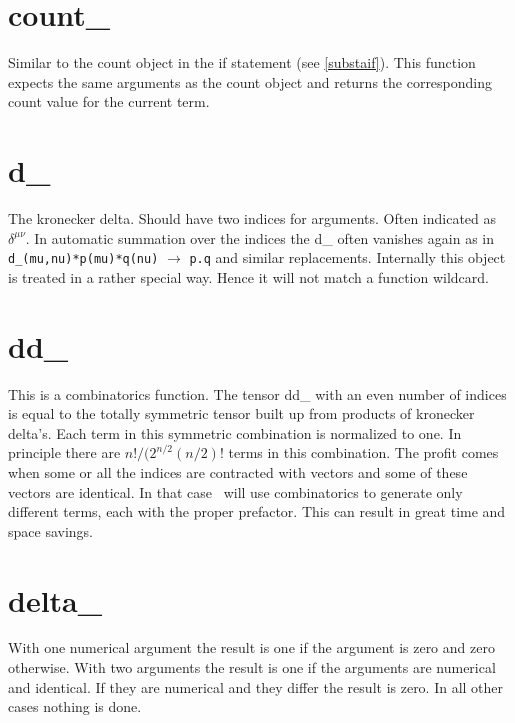 
\section{count\_}
\label{funcount}
\noindent Similar to the count object in the if statement (see 
\ref{substaif}). This function expects the same arguments as the count 
object and returns the corresponding count value for the current term.


\section{d\_}
\label{fund}
\noindent The kronecker delta. 
Should have two indices for arguments. Often indicated as 
$\delta^{\mu\nu}$. In automatic summation over the indices the d\_ often 
vanishes again as in
\verb:d_(mu,nu)*p(mu)*q(nu): $\rightarrow$ \verb:p.q: and similar 
replacements. Internally this object is treated in a rather special way. 
Hence it will not match a function wildcard.


\section{dd\_}
\label{fundd}
\noindent This is a combinatorics function. The tensor 
dd\_ with an even number of indices is equal to the totally symmetric 
tensor built up from products of kronecker delta's. Each term in this 
symmetric combination is normalized to one. In principle there are 
$n!/(2^{n/2}(n/2)!$ terms in this combination. The profit comes when some 
or all the indices are contracted with vectors and some of these vectors 
are identical. In that case \FORM\ will use combinatorics to generate only 
different terms, each with the proper prefactor. This can result in great 
time and space savings.


\section{delta\_}
\label{fundelta}
\noindent With one numerical argument the result is one if 
the argument is zero and zero otherwise. With two arguments the result is 
one if the arguments are numerical and identical. If they are numerical and 
they differ the result is zero. In all other cases nothing is done.

